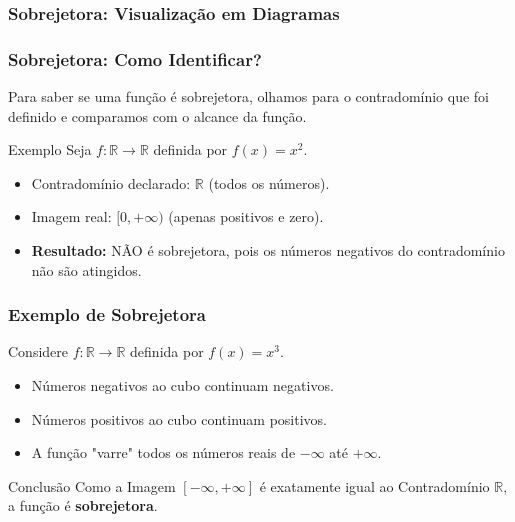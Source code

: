 \documentclass[9pt]{beamer}
\begin{document}
\begin{frame}
\frametitle{Sobrejetora: Visualização em Diagramas}
\centering
{}
\end{frame}

\begin{frame}
\frametitle{Sobrejetora: Como Identificar?}
Para saber se uma função é sobrejetora, olhamos para o contradomínio que foi definido e comparamos com o alcance da função.

\begin{exampleblock}{Exemplo}
Seja $f: \mathbb{R} \to \mathbb{R}$ definida por $f(x) = x^2$.
\begin{itemize}
    \item Contradomínio declarado: $\mathbb{R}$ (todos os números).
    \item Imagem real: $[0, +\infty)$ (apenas positivos e zero).
    \item \textbf{Resultado:} NÃO é sobrejetora, pois os números negativos do contradomínio não são atingidos.
\end{itemize}
\end{exampleblock}
\end{frame}

\begin{frame}
\frametitle{Exemplo de Sobrejetora}
Considere $f: \mathbb{R} \to \mathbb{R}$ definida por $f(x) = x^3$.

\begin{itemize}
    \item Números negativos ao cubo continuam negativos.
    \item Números positivos ao cubo continuam positivos.
    \item A função "varre" todos os números reais de $-\infty$ até $+\infty$.
\end{itemize}

\begin{block}{Conclusão}
Como a Imagem $[-\infty, +\infty]$ é exatamente igual ao Contradomínio $\mathbb{R}$, a função é \textbf{sobrejetora}.
\end{block}
\end{frame}
\end{document}
